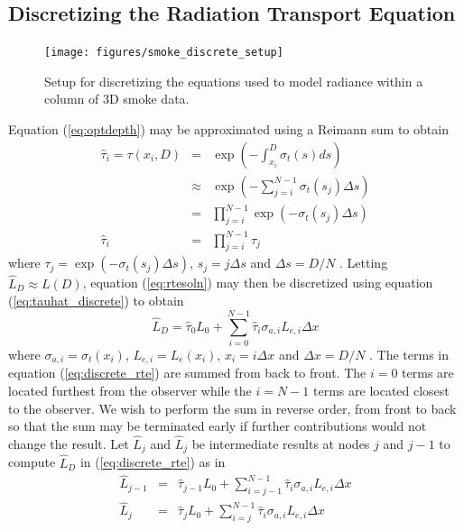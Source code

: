 \subsection{Discretizing the Radiation Transport Equation}
\newcommand{\htau}[1]{\hat{\tau}_{#1}}
\newcommand{\sigai}[1]{\sigma_{a,#1}}
\newcommand{\Lei}[1]{L_{e,#1}}

\begin{figure}[\figoptions]
\begin{center}
\texttt{[image: figures/smoke\_discrete\_setup]}
\end{center}
\caption {Setup for discretizing the equations used to model
radiance within a column of 3D smoke data.}
\label{figsmokediscretesetup}
\end{figure}

Equation (\ref{eq:optdepth}) may be approximated using a Reimann
sum  to obtain
\begin{eqnarray}
\nonumber
\hat{\tau}_i=\tau(x_i,D)&=&\exp\left(-\int_{x_i}^D\sigma_t(s)ds\right)\\
\nonumber
&\approx&\exp\left(-\sum_{j=i}^{N-1}\sigma_t(s_j)\Delta s\right)\\
\nonumber
&=&\prod_{j=i}^{N-1}\exp\left(-\sigma_t(s_j)\Delta s\right)\\
\label{eq:tauhat_discrete}
\hat{\tau}_i&=&\prod_{j=i}^{N-1}\tau_j
\end{eqnarray}
where $\tau_j=\exp\left(-\sigma_t(s_j)\Delta s\right)$,
$s_j=j\Delta s$ and $\Delta s=D/N$ . Letting $\hat{L}_D\approx L(D)$, equation (\ref{eq:rtesoln})
may then be discretized using equation (\ref{eq:tauhat_discrete})
to obtain
\begin{equation}
\label{eq:discrete_rte}
\hat{L}_D = \htau{0}L_0 +
\sum_{i=0}^{N-1}\htau{i}\sigai{i}\Lei{i}\Delta x
\end{equation}
where $\sigma_{a,i}=\sigma_t(x_i)$, $\Lei{i}=L_e(x_i)$,
$x_i=i\Delta x$ and $\Delta x=D/N$ .
The terms in equation (\ref{eq:discrete_rte}) are summed from back to front.  The $i=0$ terms are located
furthest from the observer while the $i=N-1$ terms are located closest to the observer.  We wish to perform the sum in reverse order, from front to back so that the sum may be terminated early if further contributions would not change the result. Let $\hat{L}_j$ and $\hat{L}_j$ be intermediate results at nodes $j$ and $j-1$
to compute $\hat{L}_D$ in (\ref{eq:discrete_rte}) as in
\begin{eqnarray}
\hat{L}_{j-1} &= &\htau{j-1}L_0 + \sum_{i=j-1}^{N-1}\htau{i}\sigai{i}\Lei{i}\Delta x\\
\hat{L}_j     &= &\htau{j}  L_0 + \sum_{i=j}^{N-1}  \htau{i}\sigai{i}\Lei{i}\Delta x
\end{eqnarray}
